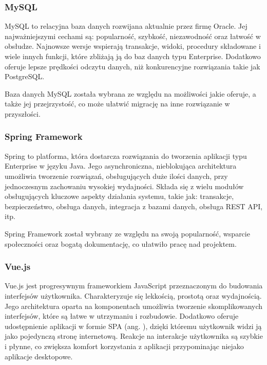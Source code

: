 \subsubsection*{MySQL}

MySQL to relacyjna baza danych rozwijana aktualnie przez firmę Oracle.
Jej najważniejszymi cechami są: popularność, szybkość, niezawodność oraz łatwość w obsłudze.
Najnowsze wersje wspierają transakcje, widoki, procedury składowane i wiele innych funkcji, które zbliżają ją do baz danych typu Enterprise.
Dodatkowo oferuje lepsze prędkości odczytu danych, niż konkurencyjne rozwiązania takie jak PostgreSQL. \cite{bib:mysql}

Baza danych MySQL została wybrana ze względu na możliwości jakie oferuje, a także jej przejrzystość, co może ułatwić migrację na inne rozwiązanie w przyszłości.

\subsubsection*{Spring Framework}

Spring to platforma, która dostarcza rozwiązania do tworzenia aplikacji typu Enterprise w języku Java.
Jego asynchroniczna, nieblokująca architektura umożliwia tworzenie rozwiązań, obsługujących duże ilości danych, przy jednoczesnym zachowaniu wysokiej wydajności.
Składa się z wielu modułów obsługujących kluczowe aspekty działania systemu, takie jak: transakcje, bezpieczeństwo, obsługa danych, integracja z bazami danych, obsługa REST API, itp. \cite{bib:spring}

Spring Framework został wybrany ze względu na swoją popularność, wsparcie społeczności oraz bogatą dokumentację, co ułatwiło pracę nad projektem.

\subsubsection*{Vue.js}

Vue.js jest progresywnym frameworkiem JavaScript przeznaczonym do budowania interfejsów użytkownika. Charakteryzuje się lekkością, prostotą oraz wydajnością. Jego architektura oparta na komponentach umożliwia tworzenie skomplikowanych interfejsów, które są łatwe w utrzymaniu i rozbudowie. Dodatkowo oferuje udostępnienie aplikacji w formie SPA (ang. ), dzięki któremu użytkownik widzi ją jako pojedynczą stronę internetową. Reakcje na interakcje użytkownika są szybkie i płynne, co zwiększa komfort korzystania z aplikacji przypominając niejako aplikacje desktopowe. \cite{bib:vuejs}

